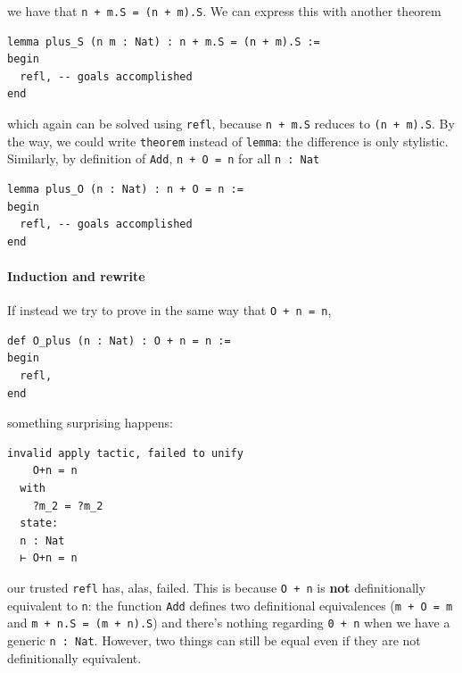 \documentclass{book}
\theoremstyle{definition}
\theoremstyle{remark}
\theoremstyle{plain}
\begin{document}
we have that \lstinline{n + m.S = (n + m).S}.
We can express this with another theorem
\begin{lstlisting}
lemma plus_S (n m : Nat) : n + m.S = (n + m).S :=
begin
  refl, -- goals accomplished
end
\end{lstlisting}
which again can be solved using \lstinline{refl}, because \lstinline{n + m.S} reduces to \lstinline{(n + m).S}.
By the way, we could write \lstinline{theorem} instead of \lstinline{lemma}: the difference is only stylistic.
Similarly, by definition of \lstinline{Add}, \lstinline{n + O = n} for all \lstinline{n : Nat}
\begin{lstlisting}
lemma plus_O (n : Nat) : n + O = n :=
begin
  refl, -- goals accomplished
end
\end{lstlisting}

\paragraph{Induction and rewrite}

If instead we try to prove in the same way that \lstinline{O + n = n},
\begin{lstlisting}
def O_plus (n : Nat) : O + n = n :=
begin
  refl,
end
\end{lstlisting}
something surprising happens:
\begin{lstlisting}
invalid apply tactic, failed to unify
    O+n = n
  with
    ?m_2 = ?m_2
  state:
  n : Nat
  ⊢ O+n = n
\end{lstlisting}
our trusted \lstinline{refl} has, alas, failed.
This is because \lstinline{O + n} is \textbf{not} definitionally equivalent to \lstinline{n}:
the function \lstinline{Add} defines two definitional equivalences
(\lstinline{m + O = m} and \lstinline{m + n.S = (m + n).S})
and there's nothing regarding \lstinline{0 + n} when we have a generic \lstinline{n : Nat}.
However, two things can still be equal even if they are not definitionally equivalent.
\end{document}
